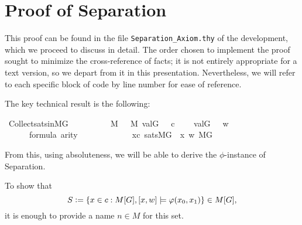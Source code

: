 \section{Proof of Separation}
\label{sec:proof-separation}

This proof can be found in the file \verb|Separation_Axiom.thy| of the
development, which we proceed to discuss in detail. The order chosen to
implement
the proof sought to minimize the cross-reference of facts;  it is
not entirely appropriate for a text version, so we depart from it in
this presentation. Nevertheless, we will refer to each specific block
of code by line number for ease of reference.

The key technical result is the following:
\begin{isabelle}
  \isamarkupfalse%
  \ Collect{\isacharunderscore}sats{\isacharunderscore}in{\isacharunderscore}MG\ {\isacharcolon}\isanewline
  \ \ \isanewline
  \ \ \ \ {\isachardoublequoteopen}{\isasympi}\ {\isasymin}\ M{\isachardoublequoteclose}\ {\isachardoublequoteopen}{\isasymsigma}\ {\isasymin}\ M{\isachardoublequoteclose}\ {\isachardoublequoteopen}val{\isacharparenleft}G{\isacharcomma}\ {\isasympi}{\isacharparenright}\ {\isacharequal}\ c{\isachardoublequoteclose}\isanewline
  \ \ \ \  {\isachardoublequoteopen}val{\isacharparenleft}G{\isacharcomma}\ {\isasymsigma}{\isacharparenright}\ {\isacharequal}\ w{\isachardoublequoteclose}\isanewline
  \ \ \ \ {\isachardoublequoteopen}{\isasymphi}\ {\isasymin}\ formula{\isachardoublequoteclose}\ {\isachardoublequoteopen}arity{\isacharparenleft}{\isasymphi}{\isacharparenright}\ {\isasymle}\ {}{\isachardoublequoteclose}\isanewline
  \ \ \ \ \ \ \isanewline
  \ \ \ \ {\isachardoublequoteopen}{\isacharbraceleft}x{\isasymin}c{\isachardot}\ sats{\isacharparenleft}M{\isacharbrackleft}G{\isacharbrackright}{\isacharcomma}\ {\isasymphi}{\isacharcomma}\ {\isacharbrackleft}x{\isacharcomma}\ w{\isacharbrackright}{\isacharparenright}{\isacharbraceright}{\isasymin}\ M{\isacharbrackleft}G{\isacharbrackright}{\isachardoublequoteclose}
\end{isabelle}
%
From this, using absoluteness, we will be able to derive the
$\phi$-instance of Separation. 

To show that   
\[
S\mathrel{\mathop:}=\{x\in c : M[G],[x,w]\models \varphi(x_0,x_1)\} \in M[G],
\]
it is enough to provide a name $n\in M$ for this set.
 
